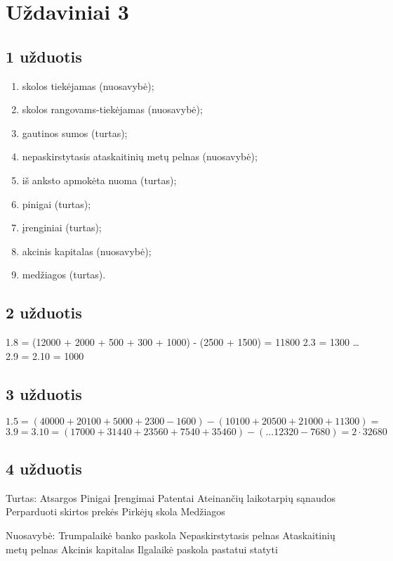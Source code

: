 \chapter{Uždaviniai 3}

\section{1 užduotis}

\begin{enumerate}
  \item skolos tiekėjamas (nuosavybė);
  \item skolos rangovams-tiekėjamas (nuosavybė);
  \item gautinos sumos (turtas);
  \item nepaskirstytasis ataskaitinių metų pelnas (nuosavybė);
  \item iš anksto apmokėta nuoma (turtas);
  \item pinigai (turtas);
  \item įrenginiai (turtas);
  \item akcinis kapitalas (nuosavybė);
  \item medžiagos (turtas).
\end{enumerate}

\section{2 užduotis}

1.8 = (12000 + 2000 + 500 + 300 + 1000) - (2500 + 1500) = 11800
2.3 = 1300
…
2.9 = 2.10 = 1000

\section{3 užduotis}

$1.5 = (40000 + 20100 + 5000 + 2300 - 1600) - (10100 + 20500 + 21000 + 11300) = $
$3.9 = 3.10 = (17000 + 31440 + 23560 + 7540 + 35460) - (… 12320  - 7680) = 2 \cdot 32680$

\section{4 užduotis}

Turtas:
Atsargos
Pinigai
Įrengimai
Patentai
Ateinančių laikotarpių sąnaudos
Perparduoti skirtos prekės
Pirkėjų skola
Medžiagos

Nuosavybė:
Trumpalaikė banko paskola
Nepaskirstytasis pelnas
Ataskaitinių metų pelnas
Akcinis kapitalas
Ilgalaikė paskola pastatui statyti

